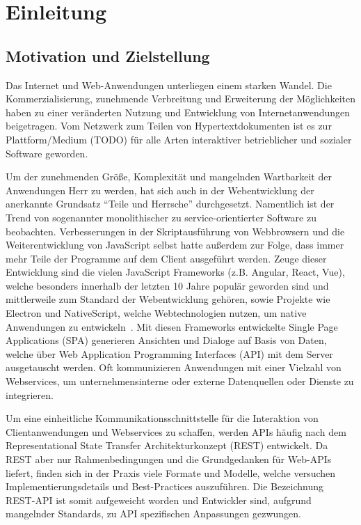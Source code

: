 \chapter{Einleitung}

\section{Motivation und Zielstellung}
Das Internet und Web-Anwendungen unterliegen einem starken Wandel.
Die Kommerzialisierung, zunehmende Verbreitung und Erweiterung der Möglichkeiten haben zu einer veränderten Nutzung und Entwicklung von Internetanwendungen beigetragen.
Vom Netzwerk zum Teilen von Hypertextdokumenten ist es zur Plattform/Medium (TODO) für alle Arten interaktiver betrieblicher und sozialer Software geworden.
\par
Um der zunehmenden Größe, Komplexität und mangelnden Wartbarkeit der Anwendungen Herr zu werden, hat sich auch in der Webentwicklung der anerkannte Grundsatz \enquote{Teile und Herrsche} durchgesetzt.
Namentlich ist der Trend von sogenannter monolithischer zu service-orientierter Software zu beobachten.
Verbesserungen in der Skriptausführung von Webbrowsern und die Weiterentwicklung von JavaScript selbst hatte außerdem zur Folge, dass immer mehr Teile der Programme auf dem Client ausgeführt werden.
Zeuge dieser Entwicklung sind die vielen JavaScript Frameworks (z.B. Angular, React, Vue), welche besonders innerhalb der letzten 10 Jahre populär geworden sind und mittlerweile zum Standard der Webentwicklung gehören, sowie Projekte wie Electron und NativeScript, welche Webtechnologien nutzen, um native Anwendungen zu entwickeln~\cite[vgl.][]{SOsurvey}.
Mit diesen Frameworks entwickelte Single Page Applications (SPA) generieren Ansichten und Dialoge auf Basis von Daten, welche über Web Application Programming Interfaces (API) mit dem Server ausgetauscht werden.
Oft kommunizieren Anwendungen mit einer Vielzahl von Webservices, \zB{} um unternehmensinterne oder externe Datenquellen oder Dienste zu integrieren.
\par
Um eine einheitliche Kommunikationsschnittstelle für die Interaktion von Clientanwendungen und Webservices zu schaffen, werden APIs häufig nach dem Representational State Transfer Architekturkonzept (REST) entwickelt.
Da REST aber nur Rahmenbedingungen und die Grundgedanken für Web-APIs liefert, finden sich in der Praxis viele Formate und Modelle, welche versuchen Implementierungsdetails und Best-Practices auszuführen.
Die Bezeichnung REST-API ist somit aufgeweicht worden und Entwickler sind, aufgrund mangelnder Standards, zu API spezifischen Anpassungen gezwungen.
